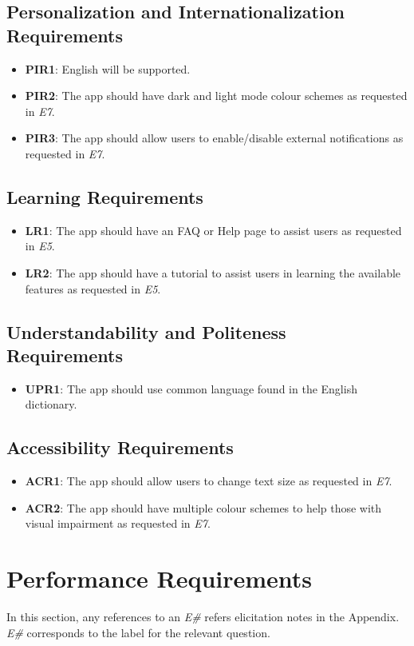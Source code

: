 \documentclass[12pt]{article}
\begin{document}
\subsection{Personalization and Internationalization Requirements}
\begin{itemize}
  \item \textbf{PIR1}: English will be supported.
  \item \textbf{PIR2}: The app should have dark and light mode colour schemes as requested in \textit{E7}.
  \item \textbf{PIR3}: The app should allow users to enable/disable external notifications as requested in \textit{E7}.
\end{itemize}
\subsection{Learning Requirements}
\begin{itemize}
  \item \textbf{LR1}: The app should have an FAQ or Help page to assist users as requested in \textit{E5}.
  \item \textbf{LR2}: The app should have a tutorial to assist users in learning the available
  features as requested in \textit{E5}.
\end{itemize}
\subsection{Understandability and Politeness Requirements}
\begin{itemize}
  \item \textbf{UPR1}: The app should use common language found in the English dictionary.
\end{itemize}
\subsection{Accessibility Requirements}
\begin{itemize}
  \item \textbf{ACR1}: The app should allow users to change text size as requested in \textit{E7}.
  \item \textbf{ACR2}: The app should have multiple colour schemes to help those with visual impairment
  as requested in \textit{E7}.
\end{itemize}

\section{Performance Requirements}
In this section, any references to an \textit{E\#} refers elicitation notes in the Appendix. \textit{E\#} corresponds
to the label for the relevant question.
\end{document}
